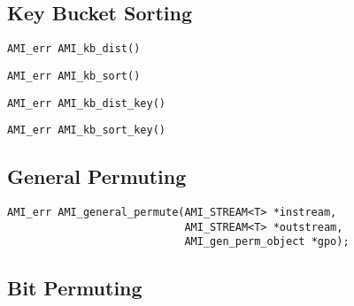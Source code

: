 
\subsection{Key Bucket Sorting}


\tobeextended

\begin{verbatim}
AMI_err AMI_kb_dist()
\end{verbatim}

\begin{verbatim}
AMI_err AMI_kb_sort()
\end{verbatim}

\begin{verbatim}
AMI_err AMI_kb_dist_key()
\end{verbatim}

\begin{verbatim}
AMI_err AMI_kb_sort_key()
\end{verbatim}


\subsection{General Permuting}


\tobeextended

\begin{verbatim}
AMI_err AMI_general_permute(AMI_STREAM<T> *instream, 
                            AMI_STREAM<T> *outstream, 
                            AMI_gen_perm_object *gpo);
\end{verbatim}

\subsection{Bit Permuting}

